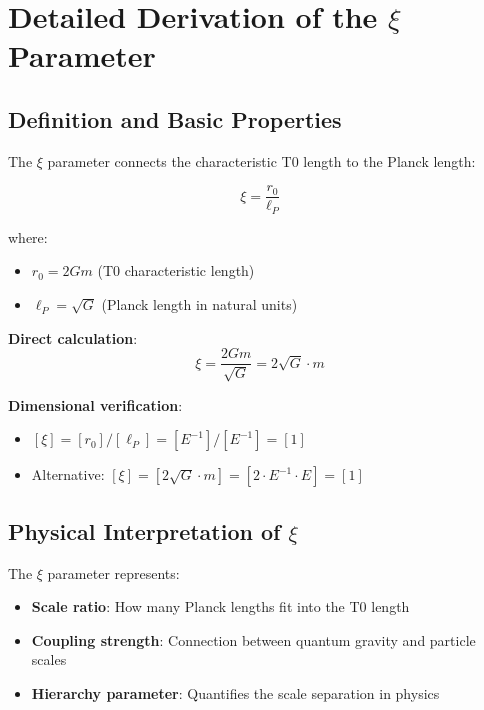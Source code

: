 \documentclass[12pt,a4paper]{article}
\begin{document}
	\section{Detailed Derivation of the $\xi$ Parameter}
	\label{sec:xi_derivation}
	
	\subsection{Definition and Basic Properties}
	\label{subsec:xi_definition}
	
	The $\xi$ parameter connects the characteristic T0 length to the Planck length:
	
	\begin{equation}
		\xi = \frac{r_0}{\ell_P}
	\end{equation}
	
	where:
	\begin{itemize}
		\item $r_0 = 2Gm$ (T0 characteristic length)
		\item $\ell_P = \sqrt{G}$ (Planck length in natural units)
	\end{itemize}
	
	\textbf{Direct calculation}:
	\begin{equation}
		\xi = \frac{2Gm}{\sqrt{G}} = 2\sqrt{G} \cdot m
	\end{equation}
	
	\textbf{Dimensional verification}:
	\begin{itemize}
		\item $[\xi] = [r_0]/[\ell_P] = [E^{-1}]/[E^{-1}] = [1]$ \checkmark
		\item Alternative: $[\xi] = [2\sqrt{G} \cdot m] = [2 \cdot E^{-1} \cdot E] = [1]$ \checkmark
	\end{itemize}
	
	\subsection{Physical Interpretation of $\xi$}
	\label{subsec:xi_interpretation}
	
	The $\xi$ parameter represents:
	\begin{itemize}
		\item \textbf{Scale ratio}: How many Planck lengths fit into the T0 length
		\item \textbf{Coupling strength}: Connection between quantum gravity and particle scales
		\item \textbf{Hierarchy parameter}: Quantifies the scale separation in physics
	\end{itemize}
	
\end{document}
